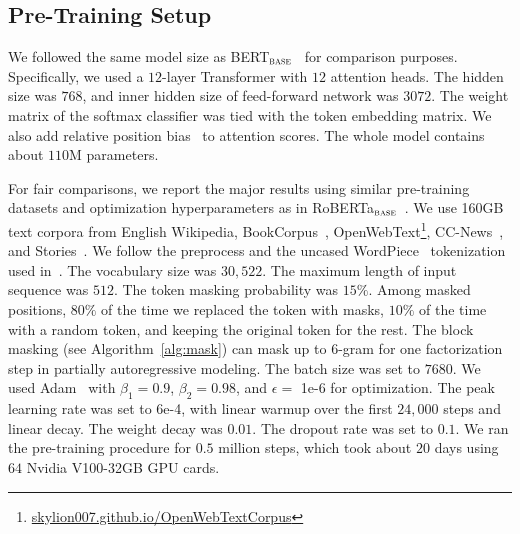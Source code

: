 \documentclass{article}
\newcommand{\bertbase}{BERT$_{\textsc{base}}$}
\newcommand{\robertabase}{RoBERTa$_{\textsc{base}}$}
\begin{document}
\subsection{Pre-Training Setup}
\label{sec:pretrain:setup}

We followed the same model size as \bertbase{}~\cite{bert} for comparison purposes.
Specifically, we used a $12$-layer Transformer with $12$ attention heads.
The hidden size was $768$, and inner hidden size of feed-forward network was $3072$.
The weight matrix of the softmax classifier was tied with the token embedding matrix.
We also add relative position bias~\cite{t5} to attention scores.
The whole model contains about $110$M parameters.

For fair comparisons, we report the major results using similar pre-training datasets and optimization hyperparameters as in \robertabase{}~\cite{roberta}.
We use 160GB text corpora from English Wikipedia, BookCorpus~\cite{bookcorpus}, OpenWebText\footnote{\url{skylion007.github.io/OpenWebTextCorpus}}, CC-News~\cite{roberta}, and Stories~\cite{stories_data}.
We follow the preprocess and the uncased WordPiece~\cite{gnmt} tokenization used in~\cite{bert}.
The vocabulary size was $30,522$. The maximum length of input sequence was $512$. The token masking probability was $15\%$.
Among masked positions, $80\%$ of the time we replaced the token with masks, $10\%$ of the time with a random token, and keeping the original token for the rest.
The block masking (see Algorithm~\ref{alg:mask}) can mask up to $6$-gram for one factorization step in partially autoregressive modeling.
The batch size was set to $7680$.
We used Adam~\cite{adam} with $\beta_1=0.9$, $\beta_2=0.98$, and $\epsilon=$ 1e-6 for optimization.
The peak learning rate was set to 6e-4, with linear warmup over the first $24,000$ steps and linear decay.
The weight decay was $0.01$. The dropout rate was set to $0.1$.
We ran the pre-training procedure for $0.5$ million steps, which took about $20$ days using $64$ Nvidia V100-32GB GPU cards.
\end{document}
